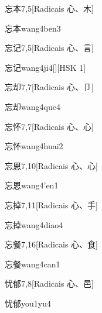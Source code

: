 \begin{entry}{忘本}{7,5}[Radicais ⼼、⽊]
  \begin{phonetics}{忘本}{wang4ben3}
  \end{phonetics}
\end{entry}

\begin{entry}{忘记}{7,5}[Radicais ⼼、⾔]
  \begin{phonetics}{忘记}{wang4ji4}[][HSK 1]
  \end{phonetics}
\end{entry}

\begin{entry}{忘却}{7,7}[Radicais ⼼、⼙]
  \begin{phonetics}{忘却}{wang4que4}
  \end{phonetics}
\end{entry}

\begin{entry}{忘怀}{7,7}[Radicais ⼼、⼼]
  \begin{phonetics}{忘怀}{wang4huai2}
  \end{phonetics}
\end{entry}

\begin{entry}{忘恩}{7,10}[Radicais ⼼、⼼]
  \begin{phonetics}{忘恩}{wang4'en1}
  \end{phonetics}
\end{entry}

\begin{entry}{忘掉}{7,11}[Radicais ⼼、⼿]
  \begin{phonetics}{忘掉}{wang4diao4}
  \end{phonetics}
\end{entry}

\begin{entry}{忘餐}{7,16}[Radicais ⼼、⾷]
  \begin{phonetics}{忘餐}{wang4can1}
  \end{phonetics}
\end{entry}

\begin{entry}{忧郁}{7,8}[Radicais ⼼、⾢]
  \begin{phonetics}{忧郁}{you1yu4}
  \end{phonetics}
\end{entry}

